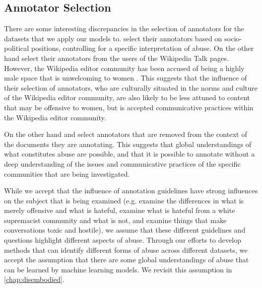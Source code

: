 \subsection{Annotator Selection}
There are some interesting discrepancies in the selection of annotators for the datasets that we apply our models to. \citet{Waseem:2016} select their annotators based on socio-political positions, controlling for a specific interpretation of abuse. On the other hand \citet{Wulczyn:2017} select their annotators from the users of the Wikipedia Talk pages. However, the Wikipedia editor community has been accused of being a highly male space that is unwelcoming to women \cite{CITE: Cite article talking about anti-women culture on wikipedia}. This suggests that the influence of their selection of annotators, who are culturally situated in the norms and culture of the Wikipedia editor community, are also likely to be less attuned to content that may be offensive to women, but is accepted communicative practices within the Wikipedia editor community.

On the other hand \citet{Garcia:2019} and \citet{Davidson:2017} select annotators that are removed from the context of the documents they are annotating. This suggests that global understandings of what constitutes abuse are possible, and that it is possible to annotate without a deep understanding of the issues and communicative practices of the specific communities that are being investigated.

While we accept that the influence of annotation guidelines have strong influences on the subject that is being examined (e.g. \citet{Davidson:2017} examine the differences in what is merely offensive and what is hateful, \citet{Garcia:2019} examine what is hateful from a white supremacist community and what is not, and \citet{Wulczyn:2017} examine things that make conversations toxic and hostile), we assume that these different guidelines and questions highlight different aspects of abuse. Through our efforts to develop methods that can identify different forms of abuse across different datasets, we accept the assumption that there are some global understandings of abuse that can be learned by machine learning models. We revisit this assumption in \autoref{chap:disembodied}.

